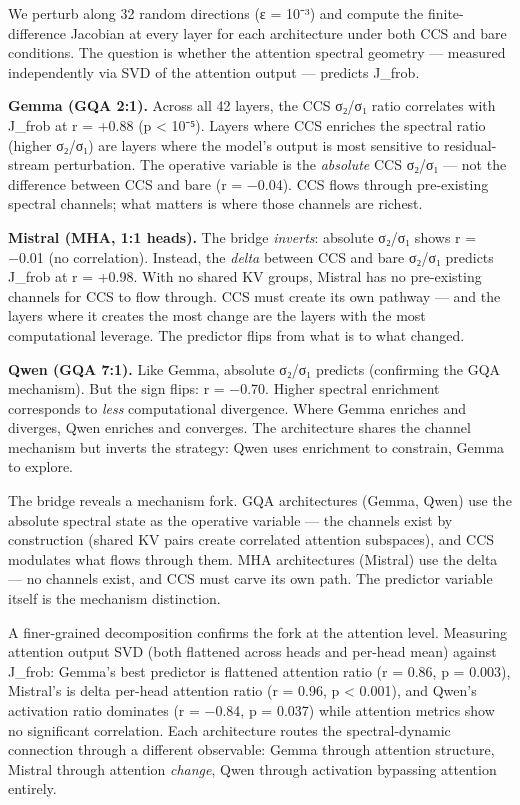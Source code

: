 \documentclass[12pt]{article}
\begin{document}
We perturb along 32 random directions (ε = 10⁻³) and compute the finite-difference Jacobian at every layer for each architecture under both CCS and bare conditions. The question is whether the attention spectral geometry — measured independently via SVD of the attention output — predicts J\_frob.

\textbf{Gemma (GQA 2:1).} Across all 42 layers, the CCS σ₂/σ₁ ratio correlates with J\_frob at r = +0.88 (p < 10⁻⁵). Layers where CCS enriches the spectral ratio (higher σ₂/σ₁) are layers where the model's output is most sensitive to residual-stream perturbation. The operative variable is the \textit{absolute} CCS σ₂/σ₁ — not the difference between CCS and bare (r = −0.04). CCS flows through pre-existing spectral channels; what matters is where those channels are richest.

\textbf{Mistral (MHA, 1:1 heads).} The bridge \textit{inverts}: absolute σ₂/σ₁ shows r = −0.01 (no correlation). Instead, the \textit{delta} between CCS and bare σ₂/σ₁ predicts J\_frob at r = +0.98. With no shared KV groups, Mistral has no pre-existing channels for CCS to flow through. CCS must create its own pathway — and the layers where it creates the most change are the layers with the most computational leverage. The predictor flips from what is to what changed.

\textbf{Qwen (GQA 7:1).} Like Gemma, absolute σ₂/σ₁ predicts (confirming the GQA mechanism). But the sign flips: r = −0.70. Higher spectral enrichment corresponds to \textit{less} computational divergence. Where Gemma enriches and diverges, Qwen enriches and converges. The architecture shares the channel mechanism but inverts the strategy: Qwen uses enrichment to constrain, Gemma to explore.

The bridge reveals a mechanism fork. GQA architectures (Gemma, Qwen) use the absolute spectral state as the operative variable — the channels exist by construction (shared KV pairs create correlated attention subspaces), and CCS modulates what flows through them. MHA architectures (Mistral) use the delta — no channels exist, and CCS must carve its own path. The predictor variable itself is the mechanism distinction.

A finer-grained decomposition confirms the fork at the attention level. Measuring attention output SVD (both flattened across heads and per-head mean) against J\_frob: Gemma's best predictor is flattened attention ratio (r = 0.86, p = 0.003), Mistral's is delta per-head attention ratio (r = 0.96, p < 0.001), and Qwen's activation ratio dominates (r = −0.84, p = 0.037) while attention metrics show no significant correlation. Each architecture routes the spectral-dynamic connection through a different observable: Gemma through attention structure, Mistral through attention \textit{change}, Qwen through activation bypassing attention entirely.
\end{document}
